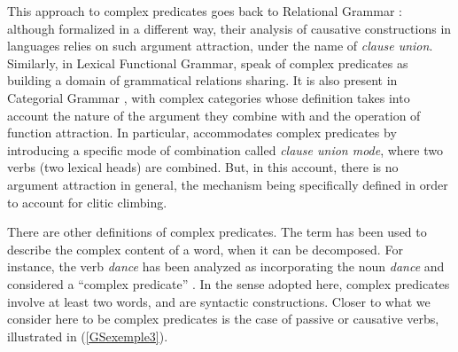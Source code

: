 	\label{GSexemple1b}  
		
	\label{GSexemple1c} 
\zl


\eal 
	\label{GSexemple2} 
	\label{GSexemple2a}
		
	\label{GSexemple2b}
		
		
	\label{GSexemple2c}			
\zl


This approach to complex predicates goes back to Relational Grammar \citep{aissen1983clause}: although formalized in a different way, their analysis of causative constructions in  languages relies on such argument attraction, under the name of \emph{clause union}. Similarly, in Lexical Functional Grammar, \citet{andrews1999complex} speak of complex predicates as building a domain of grammatical relations sharing. It is also present in Categorial Grammar \citep{Geach70a}, with complex categories whose definition takes into account the nature of the argument they combine with and the operation of function attraction. In particular, \citet[301]{kraak1998deductive} accommodates complex predicates by introducing a specific mode of combination called \emph{clause union mode}, where two verbs (two lexical heads) are combined. But, in this account, there is no argument attraction in general, the mechanism being specifically defined in order to account for clitic climbing.


There are other definitions of complex predicates. The term has been used to describe the complex
content of a word, when it can be decomposed. For instance, the verb \emph{dance} has been analyzed
as incorporating the noun \emph{dance} and considered a ``complex predicate'' \citep[31, 41]{HK97a-u}. In the sense adopted here, complex predicates involve at least two words, and are syntactic constructions. Closer to what we consider here to be complex predicates is the case of  passive or causative verbs, illustrated in (\ref{GSexemple3}).

